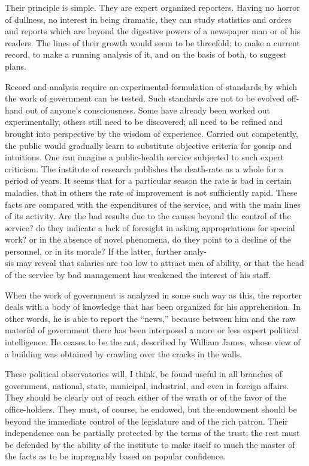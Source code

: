 \documentclass[openany,nobib,twoside,nohyper]{tufte-book}
\begin{document}
Their principle is simple. They are expert organized reporters. Having
no horror of dullness, no interest in being dramatic, they can study
statistics and orders and reports which are beyond the digestive powers
of a newspaper man or of his readers. The lines of their growth would
seem to be threefold: to make a current record, to make a running
analysis of it, and on the basis of both, to suggest plans.

Record and analysis require an experimental formulation of standards by
which the work of government can be tested. Such standards are not to be
evolved off-hand out of anyone's consciousness. Some have already been
worked out experimentally, others still need to be discovered; all need
to be refined and brought into perspective by the wisdom of experience.
Carried out competently, the public would gradually learn to substitute
objective criteria for gossip and intuitions. One can imagine a
public-health service subjected to such expert criticism. The institute
of research publishes the death-rate as a whole for a period of years.
It seems that for a particular season the rate is bad in certain
maladies, that in others the rate of improvement is not sufficiently
rapid. These facts are compared with the expenditures of the service,
and with the main lines of its activity. Are the bad results due to the
causes beyond the control of the service? do they indicate a lack of
foresight in asking appropriations for special work? or in the absence
of novel phenomena, do they point to a decline of the personnel, or in
its morale? If the latter, further analy-\\ \noindent sis may reveal that salaries are
too low to attract men of ability, or that the head of the service by
bad management has weakened the interest of his staff.

When the work of government is analyzed in some such way as this, the
reporter deals with a body of knowledge that has been organized for his
apprehension. In other words, he is able to report the ``news,'' because
between him and the raw material of government there has been interposed
a more or less expert political intelligence. He ceases to be the ant,
described by William James, whose view of a building was obtained by
crawling over the cracks in the walls.

These political observatories will, I think, be found useful in all
branches of government, national, state, municipal, industrial, and even
in foreign affairs. They should be clearly out of reach either of the
wrath or of the favor of the office-holders. They must, of course, be
endowed, but the endowment should be beyond the immediate control of the
legislature and of the rich patron. Their independence can be partially
protected by the terms of the trust; the rest must be defended by the
ability of the institute to make itself so much the master of the facts
as to be impregnably based on popular confidence.
\end{document}
